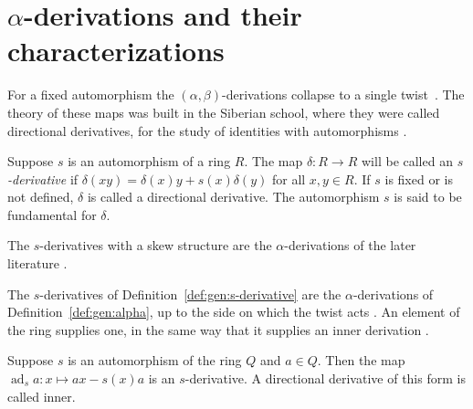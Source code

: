 \section{$\alpha$-derivations and their characterizations}\label{sec:generalized-twisted:alpha-derivations}

For a fixed automorphism the $(\alpha,\beta)$-derivations collapse to a
single twist~\cite[p.~1045]{KharchenkoPopov1991}. The theory of these maps was built in the Siberian school,
where they were called directional derivatives, for the study of identities
with automorphisms \cite[p.~1045]{KharchenkoPopov1991}.

\begin{definition}\label{def:gen:s-derivative}
Suppose $s$ is an automorphism of a ring $R$. The map
$\delta\colon R\to R$ will be called an \emph{$s$-derivative} if
$\delta(xy)=\delta(x)y+s(x)\delta(y)$ for all $x,y\in R$. If $s$ is fixed or
is not defined, $\delta$ is called a directional derivative. The
automorphism $s$ is said to be fundamental for $\delta$.
\end{definition}

The $s$-derivatives with a skew structure are the $\alpha$-derivations of the
later literature \cite[p.~885]{DeFilippisFosner2012}.

The $s$-derivatives of Definition~\ref{def:gen:s-derivative} are the
$\alpha$-derivations of Definition~\ref{def:gen:alpha}, up to the side on
which the twist acts \cite[p.~885]{DeFilippisFosner2012}. An element of the
ring supplies one, in the same way that it supplies an inner derivation
\cite[p.~1045]{KharchenkoPopov1991}.

\begin{remark}\label{rem:gen:inner-s}
Suppose $s$ is an automorphism of the ring $Q$ and $a\in Q$. Then the map
$\operatorname{ad}_{s}a\colon x\mapsto ax-s(x)a$ is an $s$-derivative. A
directional derivative of this form is called inner.
\end{remark}

